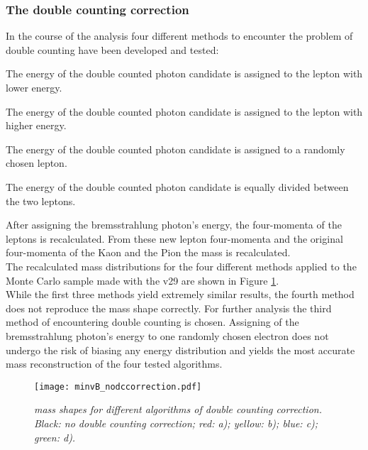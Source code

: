 \subsubsection{The double counting correction}
\label{sub:doublecountingcorrection}
In the course of the analysis four different methods to encounter the problem of double counting have been developed and tested:
\begin{compactenum}[a)]
\item The energy of the double counted photon candidate is assigned to the lepton with lower energy.
\item The energy of the double counted photon candidate is assigned to the lepton with higher energy.
\item The energy of the double counted photon candidate is assigned to a randomly chosen lepton. 
\item The energy of the double counted photon candidate is equally divided between the two leptons.
\end{compactenum}
After assigning the bremsstrahlung photon's energy, the four-momenta of the leptons is recalculated. From these new lepton four-momenta and the original four-momenta of the Kaon and the Pion the \Bd mass is recalculated.\\
The recalculated \Bd mass distributions for the four different methods applied to the \BdKstee \lhcb Monte Carlo sample made with the \davinci v29 are shown in Figure \ref{fig:double countingcorrection}. \\
While the first three methods yield extremely similar results, the fourth method does not reproduce the \Bd mass shape correctly. For further analysis the third method of encountering double counting is chosen. Assigning of the bremsstrahlung photon's energy to one randomly chosen electron does not undergo the risk of biasing any energy distribution and yields the most accurate \Bd mass reconstruction of the four tested algorithms.\\
\begin{figure}[ht]
\vspace*{-0.4cm}
  \begin{center}
    \texttt{[image: minvB\_nodccorrection.pdf]}
  \vspace*{-1.0cm}
  \end{center}
  \caption{\textit{\Bd mass shapes for different algorithms of double counting correction. Black: no double counting correction; red: a); yellow: b); blue: c); green: d). }}
  \label{fig:double countingcorrection}
\end{figure}
\\


